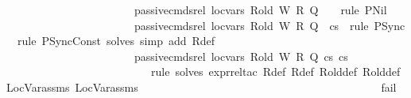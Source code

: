 \begin{isabellebody}
\ \ \ \ \ \ \ \ \ \ \ \ \ \ \ \ \ \ \ \ \ \ \ {\isachardoublequoteopen}passive{\isacharunderscore}{\kern0pt}cmds{\isacharunderscore}{\kern0pt}rel\ {\isacharquery}{\kern0pt}loc{\isacharunderscore}{\kern0pt}vars\ {\isacharquery}{\kern0pt}R{\isacharunderscore}{\kern0pt}old\ {\isacharquery}{\kern0pt}W\ {\isacharquery}{\kern0pt}R\ {\isacharquery}{\kern0pt}Q\ {\isacharbrackleft}{\kern0pt}{\isacharbrackright}{\kern0pt}\ {\isacharbrackleft}{\kern0pt}{\isacharbrackright}{\kern0pt}{\isachardoublequoteclose}\ {\isasymRightarrow}\ {\isacartoucheopen}rule\ PNil{\isacartoucheclose}\ {\isasymbar}\isanewline
\ \ \ \ \ \ \ \ \ \ \ \ \ \ \ \ \ \ \ \ \ \ \ {\isachardoublequoteopen}passive{\isacharunderscore}{\kern0pt}cmds{\isacharunderscore}{\kern0pt}rel\ {\isacharquery}{\kern0pt}loc{\isacharunderscore}{\kern0pt}vars\ {\isacharquery}{\kern0pt}R{\isacharunderscore}{\kern0pt}old\ {\isacharquery}{\kern0pt}W\ {\isacharquery}{\kern0pt}R\ {\isacharquery}{\kern0pt}Q\ {\isacharbrackleft}{\kern0pt}{\isacharbrackright}{\kern0pt}\ {\isacharquery}{\kern0pt}cs{}{\isachardoublequoteclose}\ {\isasymRightarrow}\ {\isacartoucheopen}{\isacharparenleft}{\kern0pt}rule\ PSync\ {\isacharbar}{\kern0pt}\ rule\ PSyncConst{\isacharparenright}{\kern0pt}{\isacharcomma}{\kern0pt}\ solves\ {\isasymopen}simp\ add{\isacharcolon}{\kern0pt}\ R{\isacharunderscore}{\kern0pt}def{\isasymclose}{\isacartoucheclose}\ \ {\isasymbar}\isanewline
\ \ \ \ \ \ \ \ \ \ \ \ \ \ \ \ \ \ \ \ \ \ \ {\isachardoublequoteopen}passive{\isacharunderscore}{\kern0pt}cmds{\isacharunderscore}{\kern0pt}rel\ {\isacharquery}{\kern0pt}loc{\isacharunderscore}{\kern0pt}vars\ {\isacharquery}{\kern0pt}R{\isacharunderscore}{\kern0pt}old\ {\isacharquery}{\kern0pt}W\ {\isacharquery}{\kern0pt}R\ {\isacharquery}{\kern0pt}Q\ {\isacharquery}{\kern0pt}cs{}\ {\isacharquery}{\kern0pt}cs{}{\isachardoublequoteclose}\ {\isasymRightarrow}\isanewline
\ \ \ \ \ \ \ \ \ \ \ \ \ \ \ \ \ \ \ \ \ \ \ \ \ \ {\isacartoucheopen}rule{\isacharcomma}{\kern0pt}\ solves\ {\isasymopen}expr{\isacharunderscore}{\kern0pt}rel{\isacharunderscore}{\kern0pt}tac\ R{\isacharunderscore}{\kern0pt}def{\isacharcolon}{\kern0pt}\ R{\isacharunderscore}{\kern0pt}def\ R{\isacharunderscore}{\kern0pt}old{\isacharunderscore}{\kern0pt}def{\isacharcolon}{\kern0pt}\ R{\isacharunderscore}{\kern0pt}old{\isacharunderscore}{\kern0pt}def\ LocVar{\isacharunderscore}{\kern0pt}assms{\isacharcolon}{\kern0pt}\ LocVar{\isacharunderscore}{\kern0pt}assms{\isasymclose}{\isacartoucheclose}\ {\isasymbar}\ \ \ \ \ \ \ \ \ \ \ \ \ \ \ \ \ \isanewline
\ \ \ \ \ \ \ \ \ \ \ \ \ \ \ \ \ \ \ \ \ \ \ {\isachardoublequoteopen}{\isacharunderscore}{\kern0pt}{\isachardoublequoteclose}\ {\isasymRightarrow}\ fail{\isacharparenright}{\kern0pt}\isanewline

\end{isabellebody}
